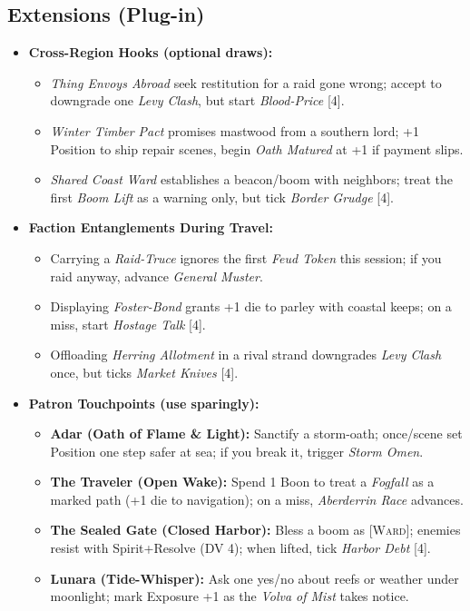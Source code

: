 \subsection*{Extensions (Plug-in)}
\label{sec:linn-extensions}
\begin{itemize}
  \item \textbf{Cross-Region Hooks (optional draws):}
  \begin{itemize}
    \item \emph{Thing Envoys Abroad} seek restitution for a raid gone wrong; accept to downgrade one \emph{Levy Clash}, but start \emph{Blood-Price} [4].
    \item \emph{Winter Timber Pact} promises mastwood from a southern lord; +1 Position to ship repair scenes, begin \emph{Oath Matured} at +1 if payment slips.
    \item \emph{Shared Coast Ward} establishes a beacon/boom with neighbors; treat the first \emph{Boom Lift} as a warning only, but tick \emph{Border Grudge} [4].
  \end{itemize}

  \item \textbf{Faction Entanglements During Travel:}
  \begin{itemize}
    \item Carrying a \emph{Raid-Truce} ignores the first \emph{Feud Token} this session; if you raid anyway, advance \emph{General Muster}.
    \item Displaying \emph{Foster-Bond} grants +1 die to parley with coastal keeps; on a miss, start \emph{Hostage Talk} [4].
    \item Offloading \emph{Herring Allotment} in a rival strand downgrades \emph{Levy Clash} once, but ticks \emph{Market Knives} [4].
  \end{itemize}

  \item \textbf{Patron Touchpoints (use sparingly):}
  \begin{itemize}
    \item \textbf{Adar (Oath of Flame \& Light):} Sanctify a storm-oath; once/scene set Position one step safer at sea; if you break it, trigger \emph{Storm Omen}.
    \item \textbf{The Traveler (Open Wake):} Spend 1 Boon to treat a \emph{Fogfall} as a marked path (+1 die to navigation); on a miss, \emph{Aberderrin Race} advances.
    \item \textbf{The Sealed Gate (Closed Harbor):} Bless a boom as [\textsc{Ward}]; enemies resist with Spirit+Resolve (DV 4); when lifted, tick \emph{Harbor Debt} [4].
    \item \textbf{Lunara (Tide-Whisper):} Ask one yes/no about reefs or weather under moonlight; mark Exposure +1 as the \emph{Volva of Mist} takes notice.
  \end{itemize}


\end{itemize}
